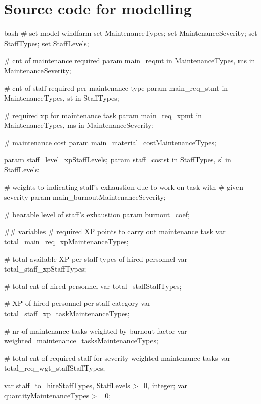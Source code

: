 \section{Source code for modelling}
    \vspace{2pt}
    \begin{boxminted}{bash}
        # set model windfarm
        set MaintenanceTypes;
        set MaintenanceSeverity;
        set StaffTypes;
        set StaffLevels;
        
        # cnt of maintenance required
        param main_req{mt in MaintenanceTypes, ms in MaintenanceSeverity};
        
        # cnt of staff required per maintenance type  
        param main_req_st{mt in MaintenanceTypes, st in StaffTypes};

        # required xp for maintenance task  
        param main_req_xp{mt in MaintenanceTypes, ms in MaintenanceSeverity}; 

        # maintenance cost  
        param main_material_cost{MaintenanceTypes}; 
            
        param staff_level_xp{StaffLevels};  
        param staff_cost{st in StaffTypes, sl in StaffLevels}; 	

        # weights to indicating staff's exhaustion due to work on task with 
        # given severity  
        param main_burnout{MaintenanceSeverity}; 

        # bearable level of staff's exhaustion  
        param burnout_coef; 
        
        ## variables
        # required XP points to carry out maintenance task
        var total_main_req_xp{MaintenanceTypes}; 

        # total available XP per staff types of hired personnel
        var total_staff_xp{StaffTypes};
        
        # total cnt of hired personnel
        var total_staff{StaffTypes}; 

        # XP of hired personnel per staff category
        var total_staff_xp_task{MaintenanceTypes}; 

        # nr of maintenance tasks weighted by burnout factor
        var weighted_maintenance_tasks{MaintenanceTypes}; 

        # total cnt of required staff for severity weighted maintenance tasks
        var total_req_wgt_staff{StaffTypes}; 
        
        var staff_to_hire{StaffTypes, StaffLevels} >=0, integer;
        var quantity{MaintenanceTypes} >= 0;
    \end{boxminted}
